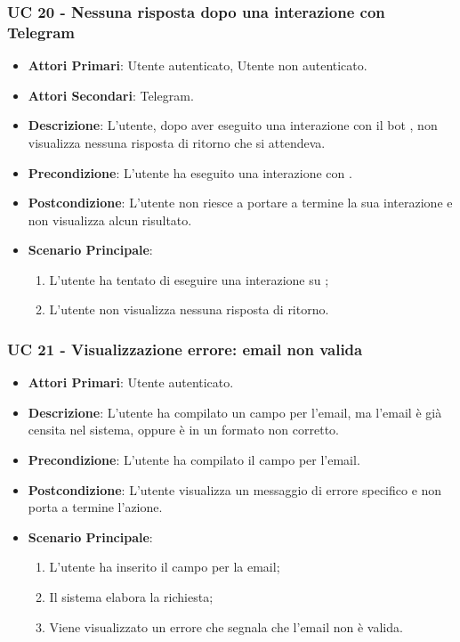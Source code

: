 
		\subsubsection{UC 20 - Nessuna risposta dopo una interazione con Telegram}
		\begin{itemize}
			\item \textbf{Attori Primari}: Utente autenticato, Utente non autenticato.
			\item \textbf{Attori Secondari}: Telegram.
			\item \textbf{Descrizione}: L'utente, dopo aver eseguito una interazione con il bot , non visualizza nessuna risposta di ritorno che si attendeva.
			\item \textbf{Precondizione}: L'utente ha eseguito una interazione con .
			\item \textbf{Postcondizione}: L'utente non riesce a portare a termine la sua interazione e non visualizza alcun risultato.
			\item \textbf{Scenario Principale}:
			\begin{enumerate}
				\item L'utente ha tentato di eseguire una interazione su ;
				\item L'utente non visualizza nessuna risposta di ritorno.
			\end{enumerate}
		\end{itemize}



		\subsubsection{UC 21 - Visualizzazione errore: email non valida}
		\begin{itemize}
			\item \textbf{Attori Primari}: Utente autenticato.
			\item \textbf{Descrizione}: L'utente ha compilato un campo per l'email, ma l'email è già censita nel sistema, oppure è in un formato non corretto.
			\item \textbf{Precondizione}: L'utente ha compilato il campo per l'email.
			\item \textbf{Postcondizione}: L'utente visualizza un messaggio di errore specifico e non porta a termine l'azione.
			\item \textbf{Scenario Principale}:
			\begin{enumerate}
				\item L'utente ha inserito il campo per la email;
				\item Il sistema elabora la richiesta;
				\item Viene visualizzato un errore che segnala che l'email non è valida.
			\end{enumerate}
		\end{itemize}

